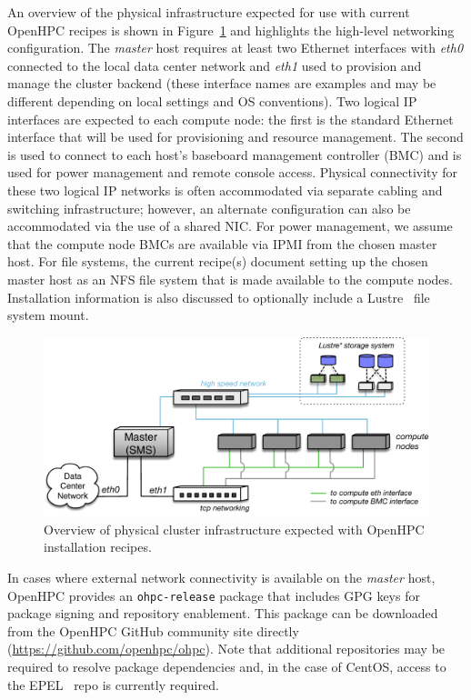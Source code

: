 \documentclass{sig-alternate-05-2015}
\begin{document}
\newpage
An overview of the physical infrastructure expected for use with
current OpenHPC recipes is shown in
Figure~\ref{fig:cluster_arch} and highlights the high-level networking
configuration. The {\em master} host requires at least two Ethernet interfaces
with {\em eth0} connected to the local data center network and {\em eth1} used
to provision and manage the cluster backend (these interface names
are examples and may be different depending on local settings and OS
conventions). Two logical IP interfaces are expected to each compute node: the
first is the standard Ethernet interface that will be used for provisioning and
resource management. The second is used to connect to each host's baseboard
management controller (BMC) and is
used for power management and remote console access. Physical connectivity for
these two logical IP networks is often accommodated via separate cabling and
switching infrastructure; however, an alternate configuration can also be
accommodated via the use of a shared NIC.
For power management, we assume that the compute node
BMCs are available via IPMI from the chosen master host. For file
systems, the current recipe(s) document setting up the chosen master
host as an NFS file system that is made available to the compute
nodes. Installation information is also discussed to optionally include a
Lustre~\cite{Lustre_url} file system mount.

\begin{figure}[h]
  \includegraphics[width=0.95\linewidth]{figures/ohpc-arch-small.pdf}
  \caption{Overview of physical cluster infrastructure expected with OpenHPC
    installation recipes.}
  \label{fig:cluster_arch}
\end{figure}

 In cases where external network connectivity is
available on the {\em master} host, OpenHPC provides an \texttt{ohpc-release}
package that includes GPG keys for package signing and repository enablement.
This package can be downloaded from the OpenHPC GitHub community site directly
(\url{https://github.com/openhpc/ohpc}). Note that additional repositories may
be required to resolve package dependencies and, in the case of CentOS, access
to the EPEL~\cite{epel_url} repo is currently required.
\end{document}

